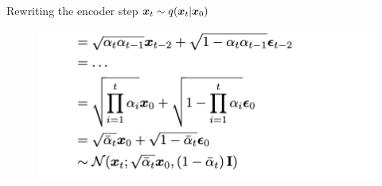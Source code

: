 \begin{frame}{Rewriting the encoder step $\boldsymbol{x}_{t} \sim q(\boldsymbol{x}_{t}|\boldsymbol{x}_0)$}
  \begin{figure}
    \centering
    \includegraphics[width=0.8\linewidth]{images/encoder_step2.png}
  \end{figure}
\end{frame}